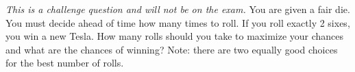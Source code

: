 \documentclass[addpoints,12pt]{exam}
\begin{document}
\begin{questions}
\addpoints

\question[2]
\emph{This is a challenge question and will not be on the exam.} You are given a fair die. You must decide ahead of time how many times to roll. If you roll exactly 2 sixes, you win a new Tesla. How many rolls should you take to maximize your chances and what are the chances of winning? Note: there are two equally good choices for the best number of rolls.

\vspace{1in}

\end{questions}
\end{document}
